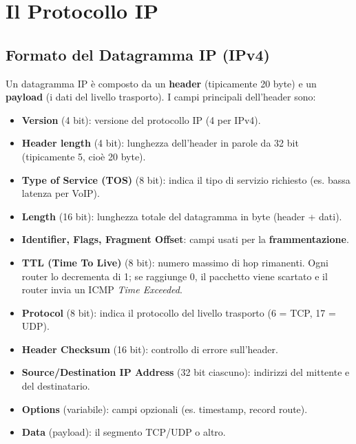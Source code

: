 
\section{Il Protocollo IP}


\subsection{Formato del Datagramma IP (IPv4)}

Un datagramma IP è composto da un \textbf{header} (tipicamente 20 byte) e un \textbf{payload} (i dati del livello trasporto). I campi principali dell'header sono:

\begin{itemize}
    \item \textbf{Version} (4 bit): versione del protocollo IP (4 per IPv4).
    \item \textbf{Header length} (4 bit): lunghezza dell'header in parole da 32 bit (tipicamente 5, cioè 20 byte).
    \item \textbf{Type of Service (TOS)} (8 bit): indica il tipo di servizio richiesto (es. bassa latenza per VoIP).
    \item \textbf{Length} (16 bit): lunghezza totale del datagramma in byte (header + dati).
    \item \textbf{Identifier, Flags, Fragment Offset}: campi usati per la \textbf{frammentazione}.
    \item \textbf{TTL (Time To Live)} (8 bit): numero massimo di hop rimanenti. Ogni router lo decrementa di 1; se raggiunge 0, il pacchetto viene scartato e il router invia un ICMP \textit{Time Exceeded}.
    \item \textbf{Protocol} (8 bit): indica il protocollo del livello trasporto (6 = TCP, 17 = UDP).
    \item \textbf{Header Checksum} (16 bit): controllo di errore sull'header.
    \item \textbf{Source/Destination IP Address} (32 bit ciascuno): indirizzi del mittente e del destinatario.
    \item \textbf{Options} (variabile): campi opzionali (es. timestamp, record route).
    \item \textbf{Data} (payload): il segmento TCP/UDP o altro.
\end{itemize}

